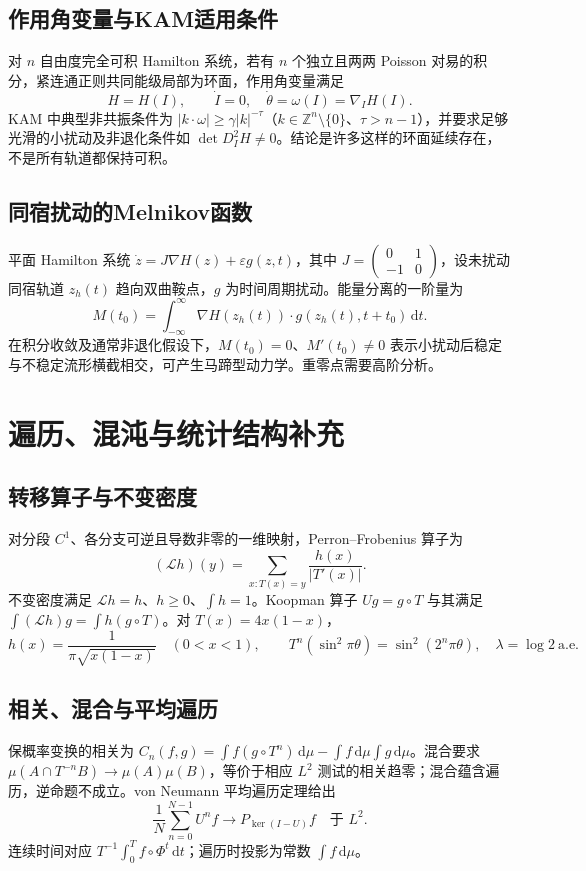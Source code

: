 \documentclass[../main.tex]{subfiles}
\begin{document}
\subsection{作用角变量与KAM适用条件}
对 $n$ 自由度完全可积 Hamilton 系统，若有 $n$ 个独立且两两 Poisson 对易的积分，紧连通正则共同能级局部为环面，作用角变量满足
\[
H=H(I),\qquad\dot I=0,\quad\dot\theta=\omega(I)=\nabla_IH(I).
\]
KAM 中典型非共振条件为 $|k\cdot\omega|\ge\gamma|k|^{-\tau}$（$k\in\mathbb Z^n\setminus\{0\}$、$\tau>n-1$），并要求足够光滑的小扰动及非退化条件如 $\det D_I^2H\ne0$。结论是许多这样的环面延续存在，不是所有轨道都保持可积。
\subsection{同宿扰动的Melnikov函数}
平面 Hamilton 系统 $\dot z=J\nabla H(z)+\varepsilon g(z,t)$，其中 $J=\left(\begin{smallmatrix}0&1\\-1&0\end{smallmatrix}\right)$，设未扰动同宿轨道 $z_h(t)$ 趋向双曲鞍点，$g$ 为时间周期扰动。能量分离的一阶量为
\[
M(t_0)=\int_{-\infty}^{\infty}\nabla H(z_h(t))\cdot g(z_h(t),t+t_0)\,\mathrm dt.
\]
在积分收敛及通常非退化假设下，$M(t_0)=0$、$M'(t_0)\ne0$ 表示小扰动后稳定与不稳定流形横截相交，可产生马蹄型动力学。重零点需要高阶分析。
\section{遍历、混沌与统计结构补充}
\subsection{转移算子与不变密度}
对分段 $C^1$、各分支可逆且导数非零的一维映射，Perron--Frobenius 算子为
\[
(\mathcal Lh)(y)=\sum_{x:T(x)=y}\frac{h(x)}{|T'(x)|}.
\]
不变密度满足 $\mathcal Lh=h$、$h\ge0$、$\int h=1$。Koopman 算子 $Ug=g\circ T$ 与其满足 $\int(\mathcal Lh)g=\int h(g\circ T)$。对 $T(x)=4x(1-x)$，
\[
h(x)=\frac1{\pi\sqrt{x(1-x)}}\quad(0<x<1),\qquad
T^n(\sin^2\pi\theta)=\sin^2(2^n\pi\theta),\quad\lambda=\log2\ \text{a.e.}
\]
\subsection{相关、混合与平均遍历}
保概率变换的相关为 $C_n(f,g)=\int f(g\circ T^n)\,\mathrm d\mu-\int f\,\mathrm d\mu\int g\,\mathrm d\mu$。混合要求 $\mu(A\cap T^{-n}B)\to\mu(A)\mu(B)$，等价于相应 $L^2$ 测试的相关趋零；混合蕴含遍历，逆命题不成立。von Neumann 平均遍历定理给出
\[
\frac1N\sum_{n=0}^{N-1}U^nf\to P_{\ker(I-U)}f\quad\text{于 }L^2.
\]
连续时间对应 $T^{-1}\int_0^Tf\circ\Phi^t\,\mathrm dt$；遍历时投影为常数 $\int f\,\mathrm d\mu$。
\end{document}

